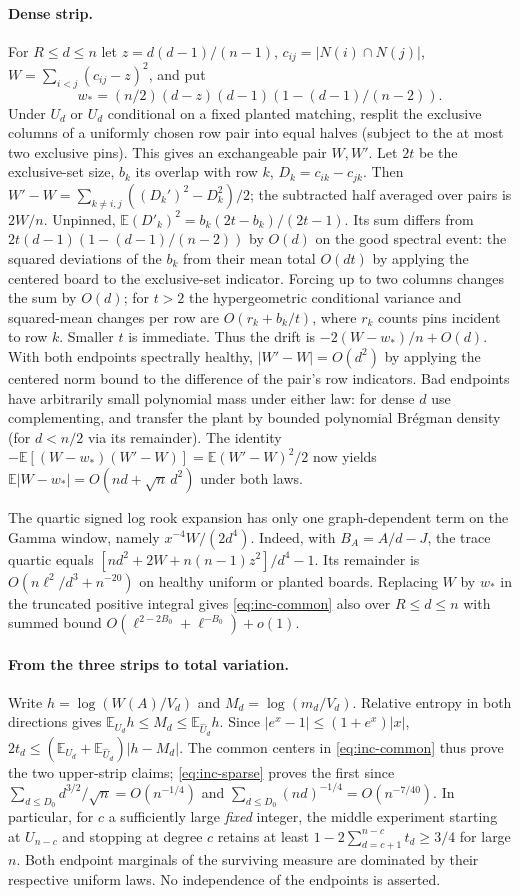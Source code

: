 \paragraph{Dense strip.}
For $R\le d\le n$ let $z=d(d-1)/(n-1)$,
$c_{ij}=|N(i)\cap N(j)|$,
$W=\sum_{i<j}(c_{ij}-z)^2$, and put
\[
 w_*=(n/2)(d-z)(d-1)(1-(d-1)/(n-2)).
\]
Under $U_d$ or $U_d$ conditional on a fixed planted matching, resplit
the exclusive columns of a uniformly chosen row pair into equal halves
(subject to the at most two exclusive pins). This gives an exchangeable
pair $W,W'$. Let $2t$ be the exclusive-set size, $b_k$ its overlap
with row $k$, $D_k=c_{ik}-c_{jk}$. Then
$W'-W=\sum_{k\ne i,j}((D_k')^2-D_k^2)/2$; the subtracted half
averaged over pairs is $2W/n$. Unpinned,
$\mathbb E(D'_k)^2=b_k(2t-b_k)/(2t-1)$. Its sum differs from
$2t(d-1)(1-(d-1)/(n-2))$ by $O(d)$ on the good spectral event:
the squared deviations of the $b_k$ from their mean total $O(dt)$
by applying the centered board to the exclusive-set indicator.
Forcing up to two columns changes the sum by $O(d)$; for $t>2$ the
hypergeometric conditional variance and squared-mean changes per row
are $O(r_k+b_k/t)$, where $r_k$ counts pins incident to row $k$.
Smaller $t$ is immediate. Thus the drift is $-2(W-w_*)/n+O(d)$.
With both endpoints spectrally healthy, $|W'-W|=O(d^2)$ by applying
the centered norm bound to the difference of the pair's row indicators.
Bad endpoints have arbitrarily small polynomial mass under either law:
for dense $d$ use complementing, and transfer the plant by bounded
polynomial Br\'egman density (for $d<n/2$ via its remainder).
The identity
$-\mathbb E[(W-w_*)(W'-W)]=\mathbb E(W'-W)^2/2$
now yields $\mathbb E|W-w_*|=O(nd+\sqrt{n}\,d^2)$ under both laws.

The quartic signed log rook expansion has only one graph-dependent
term on the Gamma window, namely $x^{-4}W/(2d^4)$. Indeed, with
$B_A=A/d-J$, the trace quartic equals
$[nd^2+2W+n(n-1)z^2]/d^4-1$. Its remainder is
$O(n\ell^2/d^3+n^{-20})$ on healthy uniform or planted boards.
Replacing $W$ by $w_*$ in the truncated positive integral gives \eqref{eq:inc-common}
also over $R\le d\le n$ with summed bound
$O(\ell^{2-2B_0}+\ell^{-B_0})+o(1)$.


\paragraph{From the three strips to total variation.}
Write $h=\log(W(A)/V_d)$ and $M_d=\log(m_d/V_d)$.
Relative entropy in both directions gives
$\mathbb E_{U_d}h\le M_d\le\mathbb E_{\widehat U_d}h$.
Since $|e^x-1|\le(1+e^x)|x|$,
$2t_d\le(\mathbb E_{U_d}+\mathbb E_{\widehat U_d})|h-M_d|$.
The common centers in \eqref{eq:inc-common} thus prove the two upper-strip
claims; \eqref{eq:inc-sparse} proves the first since
$\sum_{d\le D_0}d^{3/2}/\sqrt n=O(n^{-1/4})$ and
$\sum_{d\le D_0}(nd)^{-1/4}=O(n^{-7/40})$.
In particular, for $c$ a sufficiently large \emph{fixed} integer, the
middle experiment starting at $U_{n-c}$ and stopping at degree $c$ retains
at least $1-2\sum_{d=c+1}^{n-c}t_d\ge 3/4$ for large $n$. Both
endpoint marginals of the surviving measure are dominated by their
respective uniform laws. No independence of the endpoints is asserted.

